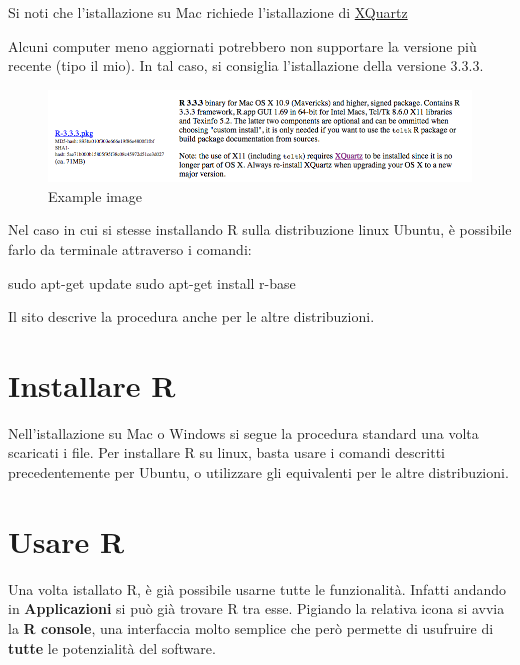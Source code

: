 \documentclass[]{book}
\newenvironment{Shaded}{\begin{snugshade}}{\end{snugshade}}
\newcommand{\FunctionTok}[1]{\textcolor[rgb]{0.00,0.00,0.00}{#1}}
\newcommand{\NormalTok}[1]{#1}
\begin{document}
Si noti che l'istallazione su Mac richiede l'istallazione di \href{https://www.xquartz.org/}{XQuartz}

Alcuni computer meno aggiornati potrebbero non supportare la versione più recente (tipo il mio). In tal caso, si consiglia l'istallazione della versione 3.3.3.

\begin{figure}
\centering
\includegraphics{./media/R330down.png}
\caption{Example image}
\end{figure}

Nel caso in cui si stesse installando R sulla distribuzione linux Ubuntu, è possibile farlo da terminale attraverso i comandi:

\begin{Shaded}
\begin{Highlighting}[]
\FunctionTok{sudo}\NormalTok{ apt-get update}
\FunctionTok{sudo}\NormalTok{ apt-get install r-base}
\end{Highlighting}
\end{Shaded}

Il sito descrive la procedura anche per le altre distribuzioni.

\hypertarget{installare-r-1}{%
\section{Installare R}\label{installare-r-1}}

Nell'istallazione su Mac o Windows si segue la procedura standard una volta scaricati i file.
Per installare R su linux, basta usare i comandi descritti precedentemente per Ubuntu, o utilizzare gli equivalenti per le altre distribuzioni.

\hypertarget{usare-r}{%
\section{Usare R}\label{usare-r}}

Una volta istallato R, è già possibile usarne tutte le funzionalità. Infatti andando in \textbf{Applicazioni} si può già trovare R tra esse. Pigiando la relativa icona si avvia la \textbf{R console}, una interfaccia molto semplice che però permette di usufruire di \textbf{tutte} le potenzialità del software.
\end{document}
